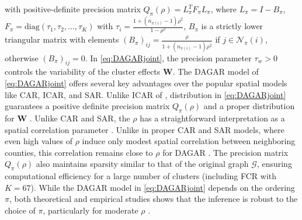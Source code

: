 \documentclass[aoas]{imsart}
\theoremstyle{plain}
\theoremstyle{definition}
\begin{document}
\noindent 
with positive-definite precision matrix $Q_\pi(\rho) = L_\pi^T F_\pi L_\pi$, where $L_\pi = I - B_\pi$, $F_\pi = \text{diag}(\tau_1, \tau_2, \ldots, \tau_K)$ with $\tau_i = \frac{1+(n_{\pi(i)}-1)\rho^2}{1-\rho^2}$,
$B_\pi$ is a strictly lower triangular matrix with elements
$(B_\pi)_{ij} = 
\frac{\rho}{1+(n_{\pi(i)}-1)\rho^2}$
if $j \in \mathcal{N}_\pi(i)$, otherwise $(B_\pi)_{ij}=0 $.
In \eqref{eq:DAGARjoint},  the precision parameter  $\tau_w > 0$  controls the variability of the cluster effects $\mathbf{W}$.
The DAGAR model of \eqref{eq:DAGARjoint} offers several key advantages over the popular spatial models like CAR, ICAR, and SAR. Unlike ICAR of  \parencite{Besag1974lattice}, distribution in \eqref{eq:DAGARjoint} guarantees a positive definite precision matrix $Q_\pi(\rho)$ and a proper distribution for $\mathbf{W}$ \parencite{datta2019dagar, Besag1974lattice, Banerjee2014spatial, Wall2004spatial}. Unlike CAR and SAR, the $\rho$ has a straightforward interpretation as a spatial correlation parameter
\parencite{datta2019dagar}. Unlike in proper CAR and SAR models, where even high values of $\rho$ induce only modest spatial correlation between neighboring counties, this correlation remains close to $\rho$ for DAGAR  \parencite{datta2019dagar, Wall2004spatial}. 
The precision matrix $Q_\pi(\rho)$ also maintains sparsity similar to that of the original graph $\mathcal{G}$, ensuring computational efficiency for a large number of clusters (including FCR with $K=67$). While the DAGAR model in \eqref{eq:DAGARjoint} depends on the ordering $\pi$, both theoretical and empirical studies shows that the inference is robust to the choice of $\pi$, particularly for moderate $\rho$ \parencite{datta2019dagar, Banerjee2014spatial, Besag1974lattice}.


   
\end{document}
